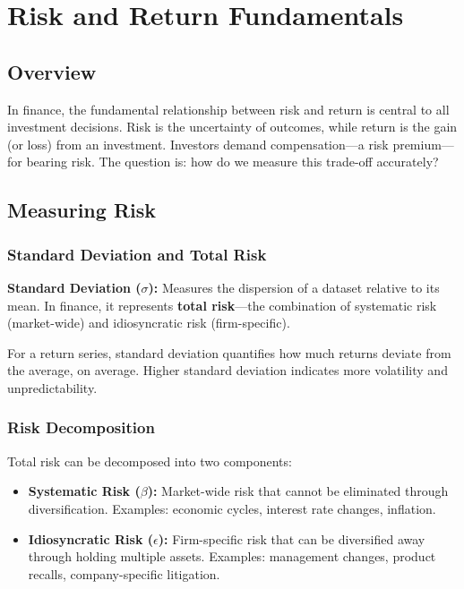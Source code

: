 
\section{Risk and Return Fundamentals}

\subsection{Overview}

In finance, the fundamental relationship between risk and return is central to all investment decisions. Risk is the uncertainty of outcomes, while return is the gain (or loss) from an investment. Investors demand compensation—a risk premium—for bearing risk. The question is: how do we measure this trade-off accurately?

\subsection{Measuring Risk}

\subsubsection{Standard Deviation and Total Risk}

\textbf{Standard Deviation ($\sigma$):} Measures the dispersion of a dataset relative to its mean. In finance, it represents \textbf{total risk}—the combination of systematic risk (market-wide) and idiosyncratic risk (firm-specific).

For a return series, standard deviation quantifies how much returns deviate from the average, on average. Higher standard deviation indicates more volatility and unpredictability.

\subsubsection{Risk Decomposition}

Total risk can be decomposed into two components:
\begin{itemize}
    \item \textbf{Systematic Risk ($\beta$):} Market-wide risk that cannot be eliminated through diversification. Examples: economic cycles, interest rate changes, inflation.
    \item \textbf{Idiosyncratic Risk ($\epsilon$):} Firm-specific risk that can be diversified away through holding multiple assets. Examples: management changes, product recalls, company-specific litigation.
\end{itemize}

